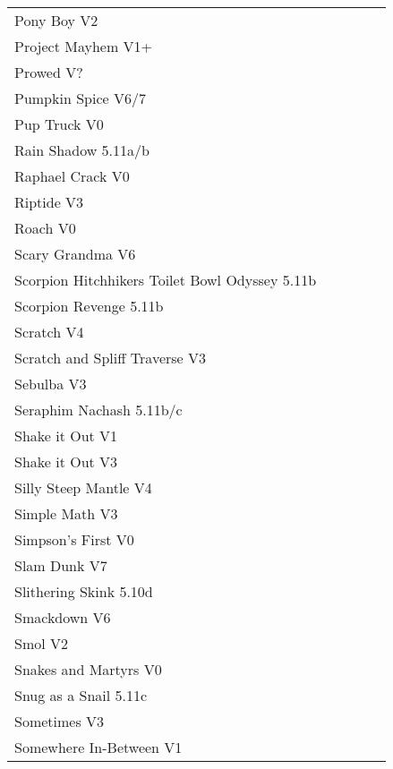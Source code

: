 \begin{flushleft}
\begin{center}
\begin{supertabular}{p{0.76\linewidth}p{0.08\linewidth}}
Pony Boy V2 & \pageref{rt:Pony Boy} \\
Project Mayhem V1+ & \pageref{rt:Project Mayhem} \\
Prowed V? & \pageref{vr:Prowed} \\
Pumpkin Spice V6/7 & \pageref{rt:Pumpkin Spice} \\
Pup Truck V0 & \pageref{rt:Pup Truck} \\
Rain Shadow 5.11a/b & \pageref{rt:Rain Shadow} \\
Raphael Crack V0 & \pageref{rt:Raphael Crack} \\
Riptide V3 & \pageref{rt:Riptide} \\
Roach V0 & \pageref{rt:Roach} \\
Scary Grandma V6 & \pageref{rt:Scary Grandma} \\
Scorpion Hitchhikers Toilet Bowl Odyssey 5.11b & \pageref{rt:Scorpion Hitchhikers Toilet Bowl Odyssey} \\
Scorpion Revenge 5.11b & \pageref{rt:Scorpion Revenge} \\
Scratch V4 & \pageref{rt:Scratch} \\
Scratch and Spliff Traverse V3 & \pageref{rt:Scratch and Spliff Traverse} \\
Sebulba V3 & \pageref{vr:Sebulba} \\
Seraphim Nachash 5.11b/c & \pageref{rt:Seraphim Nachash} \\
Shake it Out V1 & \pageref{rt:Shake it Out Frank} \\
Shake it Out V3 & \pageref{vr:Shake it Out} \\
Silly Steep Mantle V4 & \pageref{rt:Silly Steep Mantle} \\
Simple Math V3 & \pageref{rt:Simple Math} \\
Simpson's First V0 & \pageref{rt:Simpson's First} \\
Slam Dunk V7 & \pageref{rt:Slam Dunk} \\
Slithering Skink 5.10d & \pageref{rt:Slithering Skink} \\
Smackdown V6 & \pageref{rt:Smackdown} \\
Smol V2 & \pageref{rt:Smol} \\
Snakes and Martyrs V0 & \pageref{rt:Snakes and Martyrs} \\
Snug as a Snail 5.11c & \pageref{rt:Snug as a Snail} \\
Sometimes V3 & \pageref{rt:Sometimes} \\
Somewhere In-Between V1 & \pageref{rt:Somewhere In-Between} \\

\end{supertabular}
\end{center}
\end{flushleft}
